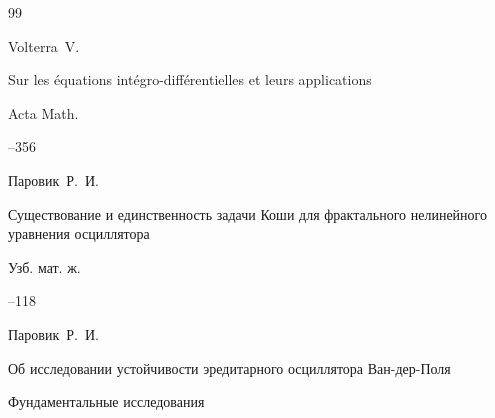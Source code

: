 \begin{thebibliography}{99}









\by Volterra~V. 

\paper Sur les \'equations int\'egro-diff\'erentielles et leurs applications

\jour Acta Math.




--356







\by Паровик~Р.~И. 

\paper Существование и единственность задачи Коши для фрактального нелинейного уравнения осциллятора

\jour Узб. мат. ж.



--118













\by Паровик~Р.~И. 

\paper Об исследовании устойчивости эредитарного осциллятора Ван-дер-Поля

\jour Фундаментальные исследования


\end{thebibliography}
